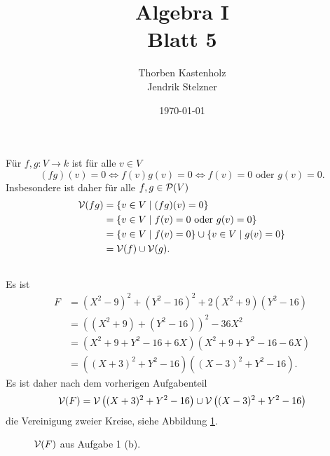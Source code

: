 \documentclass[a4paper,10pt]{article}
\title{\sc Algebra I \\ \Large Blatt 5}
\author{Thorben Kastenholz \\ Jendrik Stelzner}
\date{\today}
\begin{document}
\maketitle





\section{}


\subsection{}
Für $f,g : V \to k$ ist für alle $v \in V$
\[
 (fg)(v) = 0 \Leftrightarrow f(v)g(v) = 0 \Leftrightarrow f(v) = 0 \text{ oder } g(v) = 0.
\]
Insbesondere ist daher für alle $f,g \in \mathcal{P}(V)$
\begin{align*}
 \mathcal{V}(fg)
 &= \{v \in V \mid (fg)(v) = 0\} \\
 &= \{v \in V \mid f(v) = 0 \text{ oder } g(v) = 0\} \\
 &= \{v \in V \mid f(v) = 0\} \cup \{v \in V \mid g(v) = 0\} \\
 &= \mathcal{V}(f) \cup \mathcal{V}(g).
\end{align*}


\subsection{}
Es ist
\begin{align*}
 F
 &= \left(X^2 - 9\right)^2 + \left(Y^2 - 16\right)^2 + 2\left(X^2 + 9\right)\left(Y^2 - 16\right) \\
 &= \left( \left(X^2 + 9\right) + \left(Y^2 - 16\right) \right)^2 - 36X^2 \\
 &= \left(X^2 + 9 + Y^2 - 16 + 6X\right)(X^2 + 9 + Y^2 - 16 - 6X) \\
 &= \left( (X+3)^2 + Y^2 - 16 \right) \left( (X-3)^2 + Y^2 - 16 \right).
\end{align*}
Es ist daher nach dem vorherigen Aufgabenteil
\[
 \mathcal{V}(F) = \mathcal{V}\left((X+3)^2 + Y^2 - 16\right) \cup \mathcal{V}\left((X-3)^2 + Y^2 - 16\right)
\]
die Vereinigung zweier Kreise, siehe Abbildung \ref{fig: Vereinigung zweier Kreise}.
\begin{figure}\centering
 \caption{$\mathcal{V}(F)$ aus Aufgabe 1 (b).}
 \label{fig: Vereinigung zweier Kreise}
\end{figure}
\end{document}
